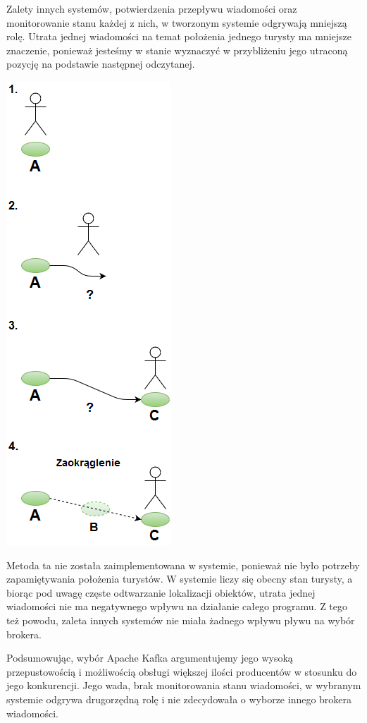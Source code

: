 \documentclass[a4paper,12pt]{article}
\begin{document}
Zalety innych systemów, potwierdzenia przepływu wiadomości oraz monitorowanie stanu każdej z nich, w tworzonym systemie odgrywają mniejszą rolę. Utrata jednej wiadomości na temat położenia jednego turysty ma mniejsze znaczenie, ponieważ jesteśmy w stanie wyznaczyć w przybliżeniu jego utraconą pozycję na podstawie następnej odczytanej.

\begin{center}
\includegraphics[scale=1]{dk.png}
\end{center}

Metoda ta nie została zaimplementowana w systemie, ponieważ nie było potrzeby zapamiętywania położenia turystów. W systemie liczy się obecny stan turysty, a biorąc pod uwagę częste odtwarzanie lokalizacji obiektów, utrata jednej wiadomości nie ma negatywnego wpływu na działanie całego programu. Z tego też powodu, zaleta innych systemów nie miała żadnego wpływu pływu na wybór brokera.

	Podsumowując, wybór Apache Kafka argumentujemy jego wysoką przepustowością i możliwością obsługi większej ilości producentów w stosunku do jego konkurencji. Jego wada, brak monitorowania stanu wiadomości, w wybranym systemie odgrywa drugorzędną rolę i nie zdecydowała o wyborze innego brokera wiadomości.
\end{document}
